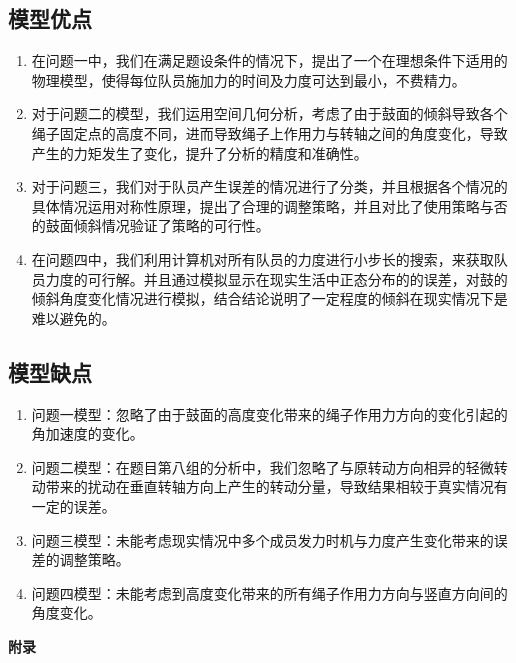 \documentclass{cumcm}
\begin{document}
\subsection{模型优点}
\begin{enumerate}
\item 在问题一中，我们在满足题设条件的情况下，提出了一个在理想条件下适用的物理模型，使得每位队员施加力的时间及力度可达到最小，不费精力。
\item 对于问题二的模型，我们运用空间几何分析，考虑了由于鼓面的倾斜导致各个绳子固定点的高度不同，进而导致绳子上作用力与转轴之间的角度变化，导致产生的力矩发生了变化，提升了分析的精度和准确性。
\item 对于问题三，我们对于队员产生误差的情况进行了分类，并且根据各个情况的具体情况运用对称性原理，提出了合理的调整策略，并且对比了使用策略与否的鼓面倾斜情况验证了策略的可行性。
\item 在问题四中，我们利用计算机对所有队员的力度进行小步长的搜索，来获取队员力度的可行解。并且通过模拟显示在现实生活中正态分布的的误差，对鼓的倾斜角度变化情况进行模拟，结合结论说明了一定程度的倾斜在现实情况下是难以避免的。
\end{enumerate}

\subsection{模型缺点}
\begin{enumerate}
\item 问题一模型：忽略了由于鼓面的高度变化带来的绳子作用力方向的变化引起的角加速度的变化。
\item 问题二模型：在题目第八组的分析中，我们忽略了与原转动方向相异的轻微转动带来的扰动在垂直转轴方向上产生的转动分量，导致结果相较于真实情况有一定的误差。
\item 问题三模型：未能考虑现实情况中多个成员发力时机与力度产生变化带来的误差的调整策略。
\item 问题四模型：未能考虑到高度变化带来的所有绳子作用力方向与竖直方向间的角度变化。
\end{enumerate}




\begin{thebibliography}{99}
\end{thebibliography}

\newpage
\appendix
\textbf{附录}
\end{document}
